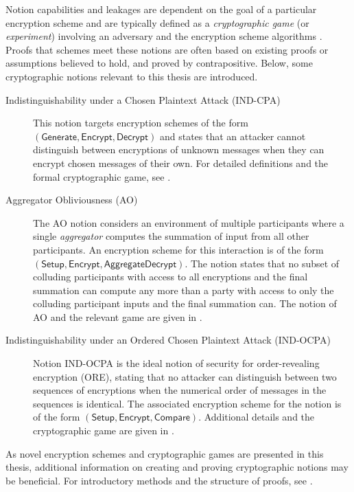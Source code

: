 Notion capabilities and leakages are dependent on the goal of a particular encryption scheme and are typically defined as a \textit{cryptographic game} (or \textit{experiment}) involving an adversary and the encryption scheme algorithms \cite{katzIntroductionModernCryptography2008,hwangModernCryptographyProof2021,bellareRandomOraclesAre1993a}. Proofs that schemes meet these notions are often based on existing proofs or assumptions believed to hold, and proved by contrapositive. Below, some cryptographic notions relevant to this thesis are introduced.
\begin{description}
    \item[Indistinguishability under a Chosen Plaintext Attack (IND-CPA)] This notion targets encryption schemes of the form $(\mathsf{Generate},\mathsf{Encrypt},\mathsf{Decrypt})$ and states that an attacker cannot distinguish between encryptions of unknown messages when they can encrypt chosen messages of their own. For detailed definitions and the formal cryptographic game, see \cite{katzIntroductionModernCryptography2008}.
    \item[Aggregator Obliviousness (AO)] The AO notion considers an environment of multiple participants where a single \textit{aggregator} computes the summation of input from all other participants. An encryption scheme for this interaction is of the form $(\mathsf{Setup},\mathsf{Encrypt},\mathsf{AggregateDecrypt})$. The notion states that no subset of colluding participants with access to all encryptions and the final summation can compute any more than a party with access to only the colluding participant inputs and the final summation can. The notion of AO and the relevant game are given in \cite{shiPrivacyPreservingAggregationTimeSeries2011}.
    \item[Indistinguishability under an Ordered Chosen Plaintext Attack (IND-OCPA)] \hspace{-0.7782pt}Notion IND-OCPA is the ideal notion of security for order-revealing encryption (ORE), stating that no attacker can distinguish between two sequences of encryptions when the numerical order of messages in the sequences is identical. The associated encryption scheme for the notion is of the form $(\mathsf{Setup},\mathsf{Encrypt},\mathsf{Compare})$. Additional details and the cryptographic game are given in \cite{boldyrevaOrderPreservingSymmetricEncryption2009}.
\end{description}
As novel encryption schemes and cryptographic games are presented in this thesis, additional information on creating and proving cryptographic notions may be beneficial. For introductory methods and the structure of proofs, see \cite{katzIntroductionModernCryptography2008,hwangModernCryptographyProof2021}.

